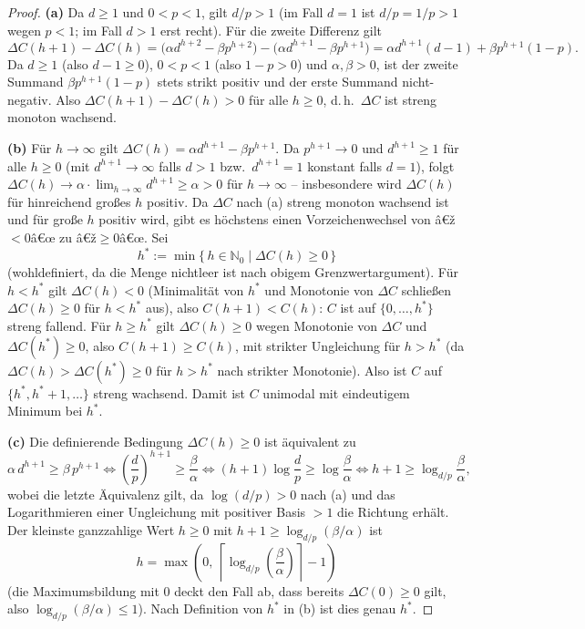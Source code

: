 ﻿\documentclass[a4paper,12pt]{article}
\theoremstyle{definition}
\begin{document}
\begin{proof}
	\textbf{(a)} Da $d\ge1$ und $0<p<1$, gilt $d/p>1$ (im Fall $d=1$ ist $d/p=1/p>1$
	wegen $p<1$; im Fall $d>1$ erst recht). Für die zweite Differenz gilt
	\[
		\Delta C(h+1)-\Delta C(h)
		= \bigl(\alpha d^{h+2}-\beta p^{h+2}\bigr) - \bigl(\alpha d^{h+1}-\beta p^{h+1}\bigr)
		= \alpha d^{h+1}(d-1) + \beta p^{h+1}(1-p).
	\]
	Da $d\ge1$ (also $d-1\ge0$), $0<p<1$ (also $1-p>0$) und $\alpha,\beta>0$, ist der
	zweite Summand $\beta p^{h+1}(1-p)$ stets strikt positiv und der erste Summand
	nicht-negativ. Also $\Delta C(h+1)-\Delta C(h)>0$ für alle $h\ge0$, d.\,h.\ $\Delta C$
	ist streng monoton wachsend.

	\textbf{(b)} Für $h\to\infty$ gilt $\Delta C(h)=\alpha d^{h+1}-\beta p^{h+1}$. Da
	$p^{h+1}\to0$ und $d^{h+1}\ge1$ für alle $h\ge0$ (mit $d^{h+1}\to\infty$ falls $d>1$
	bzw.\ $d^{h+1}=1$ konstant falls $d=1$), folgt $\Delta C(h)\to\alpha\cdot
	\lim_{h\to\infty}d^{h+1}\ge\alpha>0$ für $h\to\infty$ -- insbesondere wird
	$\Delta C(h)$ für hinreichend großes $h$ positiv. Da $\Delta C$ nach (a) streng
	monoton wachsend ist und für große $h$ positiv wird, gibt es höchstens einen
	Vorzeichenwechsel von â€ž$<0$â€œ zu â€ž$\ge0$â€œ. Sei
	\[
		h^\ast := \min\{\, h\in\mathbb{N}_0 \mid \Delta C(h)\ge0 \,\}
	\]
	(wohldefiniert, da die Menge nichtleer ist nach obigem Grenzwertargument). Für
	$h<h^\ast$ gilt $\Delta C(h)<0$ (Minimalität von $h^\ast$ und Monotonie von
	$\Delta C$ schließen $\Delta C(h)\ge0$ für $h<h^\ast$ aus), also
	$C(h+1)<C(h)$: $C$ ist auf $\{0,\ldots,h^\ast\}$ streng fallend. Für $h\ge h^\ast$
	gilt $\Delta C(h)\ge0$ wegen Monotonie von $\Delta C$ und $\Delta C(h^\ast)\ge0$,
	also $C(h+1)\ge C(h)$, mit strikter Ungleichung für $h>h^\ast$ (da $\Delta C(h)>
	\Delta C(h^\ast)\ge0$ für $h>h^\ast$ nach strikter Monotonie). Also ist $C$ auf
	$\{h^\ast,h^\ast+1,\ldots\}$ streng wachsend. Damit ist $C$ unimodal mit eindeutigem
	Minimum bei $h^\ast$.

	\textbf{(c)} Die definierende Bedingung $\Delta C(h)\ge0$ ist äquivalent zu
	\[
		\alpha\,d^{h+1}\ge\beta\,p^{h+1}
		\iff \left(\frac{d}{p}\right)^{h+1}\ge\frac{\beta}{\alpha}
		\iff (h+1)\log\frac{d}{p}\ge\log\frac{\beta}{\alpha}
		\iff h+1\ge\log_{d/p}\frac{\beta}{\alpha},
	\]
	wobei die letzte Äquivalenz gilt, da $\log(d/p)>0$ nach (a) und das Logarithmieren
	einer Ungleichung mit positiver Basis $>1$ die Richtung erhält. Der kleinste
	ganzzahlige Wert $h\ge0$ mit $h+1\ge\log_{d/p}(\beta/\alpha)$ ist
	\[
		h = \max\!\left(0,\ \left\lceil\log_{d/p}\!\left(\frac{\beta}{\alpha}\right)\right\rceil-1\right)
	\]
	(die Maximumsbildung mit $0$ deckt den Fall ab, dass bereits $\Delta C(0)\ge0$ gilt,
	also $\log_{d/p}(\beta/\alpha)\le1$). Nach Definition von $h^\ast$ in (b) ist dies
	genau $h^\ast$. \qedhere
\end{proof}
\end{document}
